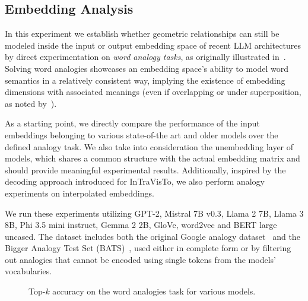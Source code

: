 \documentclass[11pt,a4paper,twocolumn]{article}
\begin{document}
\subsection{Embedding Analysis}

In this experiment we establish whether geometric relationships can still be modeled inside the input or output embedding space of recent LLM architectures by direct experimentation on \emph{word analogy tasks}, as originally illustrated in~\citet{mikolov2013}.
Solving word analogies showcases an embedding space's ability to model word semantics in a relatively consistent way, implying the existence of embedding dimensions with associated meanings (even if overlapping or under superposition, as noted by~\citet{elhage2022}).

As a starting point, we directly compare the performance of the input embeddings belonging to various state-of-the art and older models over the defined analogy task.
We also take into consideration the unembedding layer of models, which shares a common structure with the actual embedding matrix and should provide meaningful experimental results.
Additionally, inspired by the decoding approach introduced for InTraVisTo, we also perform analogy experiments on interpolated embeddings.

We run these experiments utilizing GPT-2, Mistral 7B v0.3, Llama 2 7B, Llama 3 8B, Phi 3.5 mini instruct, Gemma 2 2B, GloVe, word2vec and BERT large uncased.
The dataset includes both the original Google analogy dataset~\cite{mikolov2013} and the Bigger Analogy Test Set (BATS)~\cite{drozd2016}, used either in complete form or by filtering out analogies that cannot be encoded using single tokens from the models' vocabularies.

\begin{figure}[tbh!]
    \vspace{-10pt}
    \centering
    \quad%
    \caption{Top-$k$ accuracy on the word analogies task for various models.}
    \label{fig:exp_emb_1_A}
    \vspace{-5pt}
\end{figure}
\end{document}
